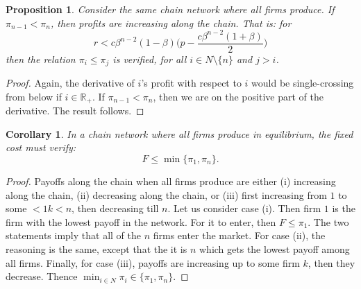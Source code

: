 \documentclass{article}
\newtheorem{corollary}{Corollary}
\newtheorem{proposition}{Proposition}
\begin{document}
\begin{proposition}
Consider the same chain network where all firms produce. If $\pi_{n-1}<\pi_n$, then profits are increasing along the chain. That is: for
\begin{equation*}
    r< c\beta^{n-2}(1-\beta)\Big(p-\dfrac{c\beta^{n-2}(1+\beta)}{2}\Big)
\end{equation*}
then the relation $\pi_i\leq \pi_j$ is verified, for all $i\in N\setminus\{n\}$ and $j>i$. 
\end{proposition} 
\begin{proof}
    Again, the derivative of $i$'s profit with respect to $i$ would be single-crossing from below if $i\in \mathbb{R}_+$. If $\pi_{n-1}<\pi_n$, then we are on the positive part of the derivative. The result follows.  
\end{proof}

\begin{corollary}
In a chain network where all firms produce in equilibrium, the fixed cost must verify: 
\begin{equation}
    F\leq \min \{\pi_1,\pi_n\}. 
\end{equation}
\end{corollary} 
\begin{proof}
Payoffs along the chain when all firms produce are either (i) increasing along the chain, (ii) decreasing along the chain, or (iii) first increasing from $1$ to some $<1k<n$, then decreasing till $n$. Let us consider case (i). Then firm $1$ is the firm with the lowest payoff in the network. For it to enter, then $F\leq \pi_1$. The two statements imply that all of the $n$ firms enter the market. For case (ii), the reasoning is the same, except that the it is $n$ which gets the lowest payoff among all firms. Finally, for case (iii), payoffs are increasing up to some firm $k$, then they decrease. Thence $\min_{i\in N}\pi_i \in \{\pi_1,\pi_n\}$. 
\end{proof}
\end{document}
